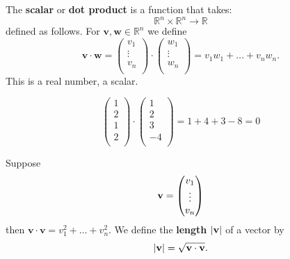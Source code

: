 \begin{definition}
    The \textbf{scalar} or \textbf{dot product} is a function that takes:
    \[\mathbb{R}^n\times\mathbb{R}^n\to\mathbb{R}\]
    defined as follows. For $\bm v,\bm w\in\mathbb{R}^n$ we define
    \[
        \bm v\cdot\bm w=
        \begin{pmatrix}
            v_1\\
            \vdots\\
            v_n\\
        \end{pmatrix}
        \cdot
        \begin{pmatrix}
            w_1\\
            \vdots\\
            w_n\\
        \end{pmatrix}
        =v_1w_1+\ldots+v_nw_n.
    \]
    This is a real number, a scalar.
\end{definition}

\begin{example}
    \[
        \begin{pmatrix}
            1\\
            2\\
            1\\
            2\\
        \end{pmatrix}
        \cdot
        \begin{pmatrix}
            1\\
            2\\
            3\\
            -4\\
        \end{pmatrix}
        =1+4+3-8=0
    \]
\end{example}

\begin{definition}
    Suppose
    \[
        \bf v=
        \begin{pmatrix}
            v_1\\
            \vdots\\
            v_n\\
        \end{pmatrix}
    \]
    then $\boldsymbol v\cdot \boldsymbol v=v_1^2+\ldots+v_n^2$. We define the \textbf{length} $|\bf v|$ of a vector by
    \[
        |\bf v|=\sqrt{\bf v\cdot\bf v}.
    \]
\end{definition}

